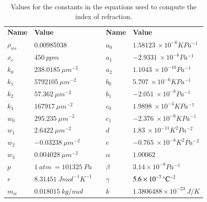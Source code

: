 \renewcommand{\arraystretch}{1.2} %
\begin{table}[htbp!]
\centering
\caption{Values for the constants in the equations used to compute the index of refraction.}
\label{tb:ciddor_constants}
\begin{tabular}{|l|l|l|l|l|}
\cline{1-2} \cline{4-5}
\textbf{Name}        & \textbf{Value}                       &  & \textbf{Name}     & \textbf{Value}                                \\ \cline{1-2} \cline{4-5} 
$\rho_{ws}$ & 0.00985938                  &  & $a_0$    & $1.58123~\times 10 ^{-6} K Pa^{-1}$  \\ \cline{1-2} \cline{4-5} 
$x_c$       & $450~ppm$                   &  & $a_1$    & $-2.9331 ~\times 10 ^{-8} Pa^{-1}$   \\ \cline{1-2} \cline{4-5} 
$k_0$       & $238.0185~\mu m^{-2}$       &  & $a_2$    & $1.1043 ~\times 10 ^{-10} Pa^{-1}$   \\ \cline{1-2} \cline{4-5} 
$k_1$       & $5792105~\mu m^{-2}$        &  & $b_0$    & $5.707~\times 10 ^{-6} K Pa^{-1}$    \\ \cline{1-2} \cline{4-5} 
$k_2$       & $57.362~\mu m^{-2}$         &  & $b_1$    & $-2.051~\times 10 ^{-8} Pa^{-1}$     \\ \cline{1-2} \cline{4-5} 
$k_3$       & $167917~\mu m^{-2}$         &  & $c_0$    & $1.9898~\times 10 ^{-4} K Pa^{-1}$   \\ \cline{1-2} \cline{4-5} 
$w_0$       & $295.235~\mu m^{-2}$        &  & $c_1$    & $-2.376~\times 10 ^{-6} K Pa^{-1}$   \\ \cline{1-2} \cline{4-5} 
$w_1$       & $2.6422~\mu m^{-2}$         &  & $d$      & $1.83~\times 10 ^{-11} K^2 Pa^{-2}$  \\ \cline{1-2} \cline{4-5} 
$w_2$       & $-0.03238~\mu m^{-2}$       &  & $e$      & $-0.765~\times 10 ^{-8} K^2 Pa^{-2}$ \\ \cline{1-2} \cline{4-5} 
$w_3$       & $0.004028~\mu m^{-2}$       &  & $\alpha$ & $1.00062$                            \\ \cline{1-2} \cline{4-5} 
$p$         & $1~atm~ = 101 325~Pa$       &  & $\beta$  & $3.14 \times 10^{-8} Pa^{-1}$        \\ \cline{1-2} \cline{4-5} 
$r$         & $8.31451~J mol^{-1} K^{-1}$ &  & $\gamma$ & $5.6 \times 10^{-7} \,^{\circ}{\rm C}^{-2}$         \\ \cline{1-2} \cline{4-5} 
$m_w$       & $0.018015~kg/mol$           &  & $k$      & $1.3806488 \times 10^{-23}~J/K$      \\ \cline{1-2} \cline{4-5} 

\end{tabular}
\end{table}
